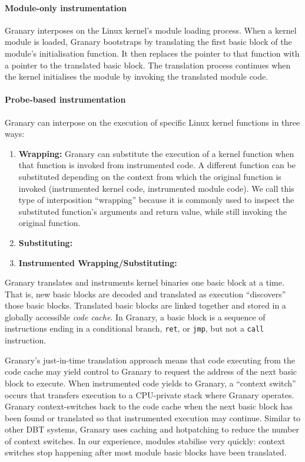 \documentclass[preprint]{sigplanconf}
\begin{document}
\paragraph{Module-only instrumentation}
Granary interposes on the Linux kernel's module loading process. When a kernel module is loaded, Granary bootstraps by translating the first basic block of the module's initialisation function.  It then replaces the pointer to that function with a pointer to the translated basic block. The translation process continues when the kernel initialises the module by invoking the translated module code.

\paragraph{Probe-based instrumentation}
Granary can interpose on the execution of specific Linux kernel functions in three ways:
\begin{enumerate}
	\item {\bf Wrapping:} Granary can substitute the execution of a kernel function when that function is invoked from instrumented code. A different function can be substituted depending on the context from which the original function is invoked (instrumented kernel code, instrumented module code). We call this type of interposition ``wrapping'' because it is commonly used to inspect the substituted function's arguments and return value, while still invoking the original function.
	\item {\bf Substituting:}
	\item {\bf Instrumented Wrapping/Substituting:}
\end{enumerate}

Granary translates and instruments kernel binaries one basic block at a time. That is, new basic blocks are decoded and translated as execution ``discovers'' those basic blocks. Translated basic blocks are linked together and stored in a globally accessible \emph{code cache}. In Granary, a basic block is a sequence of instructions ending in a conditional branch, \texttt{ret}, or \texttt{jmp}, but not a \texttt{call} instruction.

Granary's just-in-time translation approach means that code executing from the code cache may yield control to Granary to request the address of the next basic block to execute. When instrumented code yields to Granary, a ``context switch'' occurs that transfers execution to a CPU-private stack where Granary operates. Granary context-switches back to the code cache when the next basic block has been found or translated so that instrumented execution may continue. Similar to other DBT systems, Granary uses caching and hotpatching to reduce the number of context switches. In our experience, modules stabilise very quickly: context switches stop happening after most module basic blocks have been translated.
\end{document}
